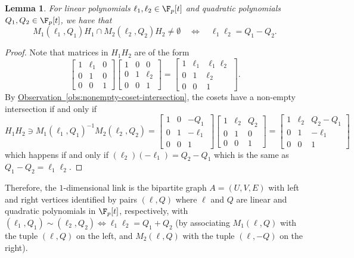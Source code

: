 \documentclass[11pt]{article}
\newcommand{\expref}[2]{\texorpdfstring{\hyperref[#2]{#1~\ref{#2}}}{#1~\ref{#2}}}
\newtheorem{lemma}[theorem]{Lemma}
\begin{document}
\begin{lemma}
  For linear polynomials $\ell_1,\ell_2 \in \F_p[t]$ and quadratic polynomials $Q_1,Q_2 \in \F_p[t]$, we have that
  \[
    M_1(\ell_1,Q_1) H_1 \cap M_2(\ell_2,Q_2) H_2 \neq \emptyset \quad\Longleftrightarrow\quad \ell_1\ell_2 = Q_1 - Q_2.
  \]
\end{lemma}
\begin{proof}
  Note that matrices in $H_1H_2$ are of the form
  \[
    \begin{bmatrix}
      1 & \ell_1 & 0\\
      0  & 1 & 0\\
      0  & 0 & 1
    \end{bmatrix}
    \begin{bmatrix}
      1 & 0 & 0\\
      0  & 1 & \ell_2\\
      0  & 0 & 1
    \end{bmatrix} = \begin{bmatrix}
      1 & \ell_1 & \ell_1\ell_2\\
      0  & 1 & \ell_2\\
      0  & 0 & 1
    \end{bmatrix}.
  \]
  By \expref{Observation}{obs:nonempty-coset-intersection}, the cosets have a non-empty intersection if and only if
  \[
    H_1 H_2 \ni M_1(\ell_1,Q_1)^{-1} M_2(\ell_2,Q_2) = \begin{bmatrix}
      1 & 0 & -Q_1\\
      0 & 1 & -\ell_1\\
      0 & 0 & 1
    \end{bmatrix}\begin{bmatrix}
      1 & \ell_2 & Q_2\\
      0 & 1 & 0\\
      0 & 0 & 1
    \end{bmatrix} = \begin{bmatrix}
      1 & \ell_2 & Q_2 - Q_1\\0 & 1 & -\ell_1 \\ 0 & 0 & 1
    \end{bmatrix}
  \]
  which happens if and only if $(\ell_2)(-\ell_1) = Q_2 - Q_1$ which is the same as $Q_1 - Q_2 = \ell_1\ell_2$. 
\end{proof}

Therefore, the $1$-dimensional link is the bipartite graph $A=(U,V,E)$
with left and right vertices identified by pairs $(\ell,Q)$ where
$\ell$ and $Q$ are linear and quadratic polynomials 
in $\F_p[t]$,  %
respectively, with
$(\ell_1,Q_1) \sim (\ell_2,Q_2) \Leftrightarrow \ell_1\ell_2 = Q_1 +
Q_2$ (by associating $M_1(\ell,Q)$ with the tuple $(\ell,Q)$ on the
left, and $M_2(\ell,Q)$ with the tuple $(\ell,-Q)$ on the right).
\end{document}
